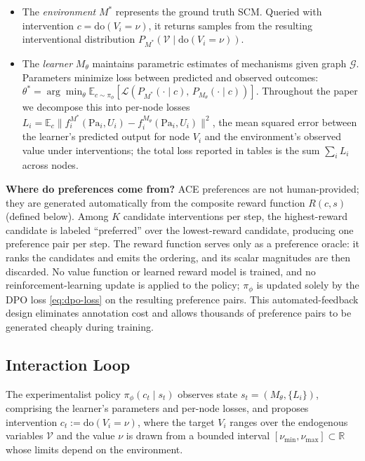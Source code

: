 \documentclass{article}
\theoremstyle{plain}
\theoremstyle{definition}
\theoremstyle{remark}
\begin{document}
\begin{itemize}[leftmargin=1.2em,topsep=0.2em,itemsep=0.1em]
\item The \emph{environment} $M^*$ represents the ground truth SCM. Queried with intervention $c = \text{do}(V_i = \nu)$, it returns samples from the resulting interventional distribution $P_{M^*}(\mathcal{V} \mid \text{do}(V_i = \nu))$.
\item The \emph{learner} $M_\theta$ maintains parametric estimates of mechanisms given graph $\mathcal{G}$. Parameters minimize loss between predicted and observed outcomes: $\theta^* = \arg\min_\theta \mathbb{E}_{c \sim \pi_\phi}[\mathcal{L}(P_{M^*}(\cdot\mid c),\, P_{M_\theta}(\cdot\mid c))]$. Throughout the paper we decompose this into per-node losses $L_i = \mathbb{E}_{c}\|f_i^{M^*}(\text{Pa}_i, U_i) - f_i^{M_\theta}(\text{Pa}_i, U_i)\|^2$, the mean squared error between the learner's predicted output for node $V_i$ and the environment's observed value under interventions; the total loss reported in tables is the sum $\sum_i L_i$ across nodes.
\end{itemize}

\textbf{Where do preferences come from?} ACE preferences are not human-provided; they are generated automatically from the composite reward function $R(c, s)$ (defined below). Among $K$ candidate interventions per step, the highest-reward candidate is labeled ``preferred'' over the lowest-reward candidate, producing one preference pair per step. The reward function serves only as a preference oracle: it ranks the candidates and emits the ordering, and its scalar magnitudes are then discarded. No value function or learned reward model is trained, and no reinforcement-learning update is applied to the policy; $\pi_\phi$ is updated solely by the DPO loss \eqref{eq:dpo-loss} on the resulting preference pairs. This automated-feedback design eliminates annotation cost and allows thousands of preference pairs to be generated cheaply during training.

\subsection{Interaction Loop}
\label{sec:interaction-loop}

The experimentalist policy $\pi_\phi(c_t \mid s_t)$ observes state $s_t = (M_\theta, \{L_i\})$, comprising the learner's parameters and per-node losses, and proposes intervention $c_t := \text{do}(V_i = \nu)$, where the target $V_i$ ranges over the endogenous variables $\mathcal{V}$ and the value $\nu$ is drawn from a bounded interval $[\nu_{\min}, \nu_{\max}] \subset \mathbb{R}$ whose limits depend on the environment.
\end{document}
